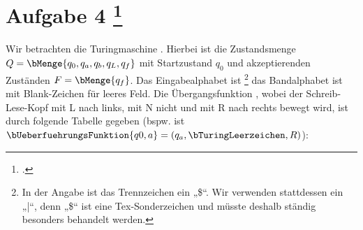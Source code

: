 \documentclass{bschlangaul-aufgabe}
\begin{document}
\let\l=\bTuringLeerzeichen
\let\d=\bUeberfuehrungsFunktion
\let\m=\bMenge
\def\p{ $\vdash$ \\}

\bAufgabenTitel{}
\section{Aufgabe 4
\footcite{examen:66115:2019:03}}

Wir betrachten die Turingmaschine \bTuringMaschine[M]{}. Hierbei ist
die Zustandsmenge $Q = \m{q_0, q_a, q_b, q_L, q_f}$ mit Startzustand
$q_0$ und akzeptierenden Zuständen $F = \m{q_f}$. Das Eingabealphabet
ist \footnote{In der Angabe ist das Trennzeichen ein
„\$“. Wir verwenden stattdessen ein „|“, denn „\$“ ist eine
Tex-Sonderzeichen und müsste deshalb ständig besonders behandelt
werden.} das Bandalphabet ist \bBandAlphabet{\l} mit Blank-Zeichen \l{}
für leeres Feld. Die Übergangsfunktion \bTuringUeberfuehrung, wobei der
Schreib-Lese-Kopf mit L nach links, mit N nicht und mit R nach rechts
bewegt wird, ist durch folgende Tabelle gegeben (bspw. ist $\d{q0, a} =
(q_a, \l, R)$):




\begin{center}
\end{center}
\end{document}
